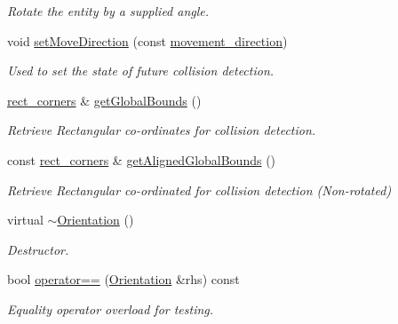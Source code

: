 \begin{DoxyCompactItemize}
\begin{DoxyCompactList}\small\item\em Rotate the entity by a supplied angle. \end{DoxyCompactList}\item 
\hypertarget{class_orientation_a478512ba497cd75f11be3aa3177cca6a}{void \hyperlink{class_orientation_a478512ba497cd75f11be3aa3177cca6a}{set\+Move\+Direction} (const \hyperlink{_structures_8h_a0d0b88f27f3adf9452879b5d9f829026}{movement\+\_\+direction})}\label{class_orientation_a478512ba497cd75f11be3aa3177cca6a}

\begin{DoxyCompactList}\small\item\em Used to set the state of future collision detection. \end{DoxyCompactList}\item 
\hypertarget{class_orientation_a950dfe84e548582d8c3c573b5ff5fe42}{\hyperlink{structrect__corners}{rect\+\_\+corners} \& \hyperlink{class_orientation_a950dfe84e548582d8c3c573b5ff5fe42}{get\+Global\+Bounds} ()}\label{class_orientation_a950dfe84e548582d8c3c573b5ff5fe42}

\begin{DoxyCompactList}\small\item\em Retrieve Rectangular co-\/ordinates for collision detection. \end{DoxyCompactList}\item 
\hypertarget{class_orientation_a5cc606289f774c8561af98d183586199}{const \hyperlink{structrect__corners}{rect\+\_\+corners} \& \hyperlink{class_orientation_a5cc606289f774c8561af98d183586199}{get\+Aligned\+Global\+Bounds} ()}\label{class_orientation_a5cc606289f774c8561af98d183586199}

\begin{DoxyCompactList}\small\item\em Retrieve Rectangular co-\/ordinated for collision detection (Non-\/rotated) \end{DoxyCompactList}\item 
\hypertarget{class_orientation_a8c96df6f0b3b9a9edc7f9a0a9cc10741}{virtual \hyperlink{class_orientation_a8c96df6f0b3b9a9edc7f9a0a9cc10741}{$\sim$\+Orientation} ()}\label{class_orientation_a8c96df6f0b3b9a9edc7f9a0a9cc10741}

\begin{DoxyCompactList}\small\item\em Destructor. \end{DoxyCompactList}\item 
\hypertarget{class_orientation_a0195b81c78baadd074301bc019d11db8}{bool \hyperlink{class_orientation_a0195b81c78baadd074301bc019d11db8}{operator==} (\hyperlink{class_orientation}{Orientation} \&rhs) const }\label{class_orientation_a0195b81c78baadd074301bc019d11db8}

\begin{DoxyCompactList}\small\item\em Equality operator overload for testing. \end{DoxyCompactList}\end{DoxyCompactItemize}


